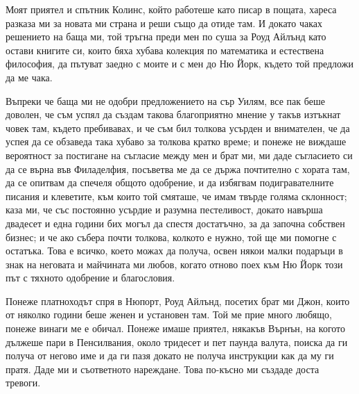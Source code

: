 \documentclass[12pt]{book}
\begin{document}
Моят приятел и спътник Колинс, който работеше като писар в пощата, хареса разказа  ми за новата ми страна и  реши също да отиде там. И докато чаках решението на баща ми, той тръгна преди мен по суша за Роуд Айлънд като остави книгите си, които бяха хубава колекция по математика и естествена философия, да пътуват заедно с моите и с мен до Ню Йорк, където той предложи да ме чака. 

Въпреки че баща ми не одобри предложението на сър Уилям, все пак беше доволен, че съм успял да създам такова благоприятно мнение у такъв изтъкнат човек там, където пребивавах, и че съм бил толкова усърден и внимателен, че да успея да се обзаведа така хубаво за толкова кратко време; и понеже не виждаше вероятност за постигане на съгласие между мен и брат ми, ми даде съгласието си да се върна във Филаделфия, посъветва ме да се държа почтително с хората там, да се опитвам да спечеля общото одобрение, и да избягвам подигравателните писания и клеветите, към които той смяташе, че имам твърде голяма склонност; каза ми, че със постоянно усърдие и разумна пестеливост, докато навърша двадесет и една години бих могъл да спестя достатъчно, за да започна собствен бизнес; и че ако събера почти толкова, колкото е нужно, той ще ми помогне с остатъка. Това е всичко, което можах да получа, освен някои малки подаръци в знак на неговата и майчината ми любов, когато отново поех към Ню Йорк този път с тяхното одобрение и благословия.

Понеже платноходът спря в Нюпорт, Роуд Айлънд, посетих брат ми Джон, които от няколко години беше женен и установен там. Той ме прие много любящо, понеже винаги ме е обичал. Понеже имаше приятел, някакъв Върнън, на когото дължеше пари в Пенсилвания, около тридесет и пет паунда валута, поиска да ги получа от негово име и да ги пазя докато не получа инструкции как да му ги пратя. Даде ми и съответното нареждане. Това по-късно ми създаде доста тревоги.
\end{document}
